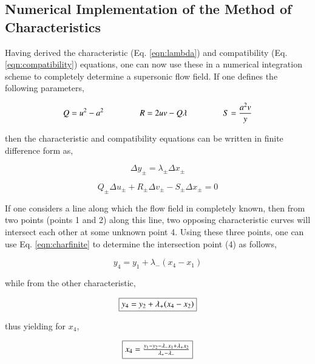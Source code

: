 \subsection{Numerical Implementation of the Method of Characteristics}

	Having derived the characteristic (Eq. \ref{eqn:lambda}) and compatibility (Eq. 
\ref{eqn:compatibility}) equations, one can now use these in a numerical integration 
scheme to completely determine a supersonic flow field.  If one defines the following 
parameters,

\begin{equation}
	Q = u^2 - a^2 \hspace {1.5cm} R = 2uv - Q\lambda \hspace{1.5cm} S = \frac{a^2v}{y}
\label{eqn:variables}
\end{equation}

	then the characteristic and compatibility equations can be written in finite difference
form as,

\begin{equation}
	\Delta y_{\pm} = \lambda_{\pm} \Delta x_{\pm}
\label{eqn:charfinite}
\end{equation}

\begin{equation}
	Q_{\pm}\Delta u_{\pm} + R_{\pm}\Delta v_{\pm} - S_{\pm}\Delta x_{\pm} = 0
\label{eqn:compfinite}
\end{equation}

	If one considers a line along which the flow field in completely known, then from 
two points (points 1 and 2) along this line, two opposing characteristic curves will intersect 
each other at some unknown point 4.  Using these three points, one can use Eq. \ref{eqn:charfinite}
to determine the intersection point (4) as follows,

\begin{displaymath}
	y_4 = y_1 + \lambda_-(x_4 - x_1)
\end{displaymath}

	while from the other characteristic,

\begin{equation}
	\fbox{$
	y_4 = y_2 + \lambda_+(x_4 - x_2) 
	$}
\label{eqn:y4}
\end{equation}

	thus yielding for $x_4$,

\begin{equation}
	\fbox{$
	x_4 = \frac{y_1 - y_2 - \lambda_-x_1 + \lambda_+x_2}{\lambda_+ - \lambda_-}
	$}
\label{eqn:x4}
\end{equation}

